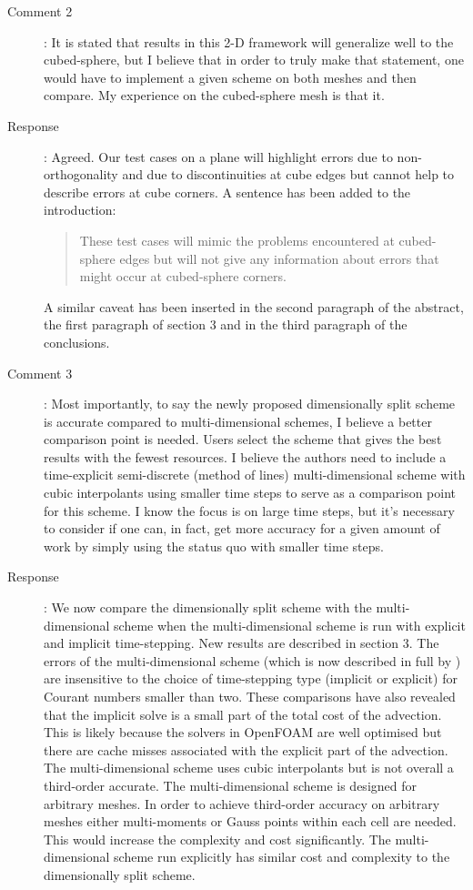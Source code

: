 \documentclass[12pt]{article}
\begin{document}
\begin{description}
\item [Comment 2]:
It is stated that results in this 2-D framework will generalize well to the cubed-sphere, but I believe that in order to truly make that statement, one would have to implement a given scheme on both meshes and then compare. My experience on the cubed-sphere mesh is that it.

\item [Response]:
Agreed. Our test cases on a plane will highlight errors due to non-orthogonality and due to discontinuities at cube edges but cannot help to describe errors at cube corners. A sentence has been added to the introduction:
\begin{quote}
These test cases will mimic the problems encountered at cubed-sphere edges but will not give any information about errors that might occur at cubed-sphere corners. 
\end{quote}
A similar caveat has been inserted in the second paragraph of the abstract, the first paragraph of section 3 and in the third paragraph of the conclusions. 

\item [Comment 3]: Most importantly, to say the newly proposed dimensionally split scheme is accurate compared to multi-dimensional schemes, I believe a better comparison point is needed. Users select the scheme that gives the best results with the fewest resources. I believe the authors need to include a time-explicit semi-discrete (method of lines) multi-dimensional scheme with cubic interpolants using smaller time steps to serve as a comparison point for this scheme. I know the focus is on large time steps, but it's necessary to consider if one can, in fact, get more accuracy for a given amount of work by simply using the status quo with smaller time steps. 

\item [Response]: 
We now compare the dimensionally split scheme with the multi-dimensional scheme when the multi-dimensional scheme is run with explicit and implicit time-stepping. New results are described in section 3. The errors of the multi-dimensional scheme (which is now described in full by \cite{SWMD17}) are insensitive to the choice of time-stepping type (implicit or explicit) for Courant numbers smaller than two. These comparisons have also revealed that the implicit solve is a small part of the total cost of the advection. This is likely because the solvers in OpenFOAM are well optimised but there are cache misses associated with the explicit part of the advection. The multi-dimensional scheme uses cubic interpolants but is not overall a third-order accurate. The multi-dimensional scheme is designed for arbitrary meshes. In order to achieve third-order accuracy on arbitrary meshes either multi-moments or Gauss points within each cell are needed. This would increase the complexity and cost significantly. The multi-dimensional scheme run explicitly has similar cost and complexity to the dimensionally split scheme. 

\end{description}
\end{document}
